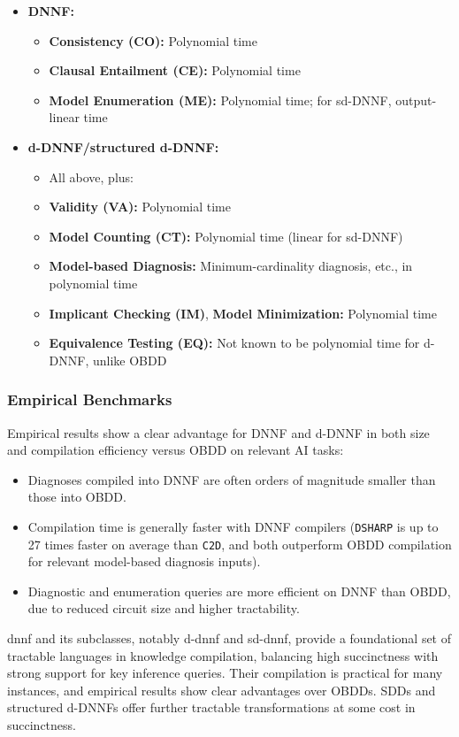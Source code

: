 \begin{itemize}
    \item \textbf{DNNF:}
    \begin{itemize}
        \item \textbf{Consistency (CO):} Polynomial time
        \item \textbf{Clausal Entailment (CE):} Polynomial time
        \item \textbf{Model Enumeration (ME):} Polynomial time; for sd-DNNF, output-linear time
    \end{itemize}
    \item \textbf{d-DNNF/structured d-DNNF:}
    \begin{itemize}
        \item All above, plus:
        \item \textbf{Validity (VA):} Polynomial time
        \item \textbf{Model Counting (CT):} Polynomial time (linear for sd-DNNF)
        \item \textbf{Model-based Diagnosis:} Minimum-cardinality diagnosis, etc., in polynomial time
        \item \textbf{Implicant Checking (IM)}, \textbf{Model Minimization:} Polynomial time
        \item \textbf{Equivalence Testing (EQ):} Not known to be polynomial time for d-DNNF, unlike OBDD
    \end{itemize}
\end{itemize}

\subsubsection{Empirical Benchmarks}
Empirical results show a clear advantage for DNNF and d-DNNF in both size and compilation efficiency versus OBDD on relevant AI tasks:
\begin{itemize}
    \item Diagnoses compiled into DNNF are often orders of magnitude smaller than those into OBDD.
    \item Compilation time is generally faster with DNNF compilers (\texttt{DSHARP} is up to 27 times faster on average than \texttt{C2D}, and both outperform OBDD compilation for relevant model-based diagnosis inputs).
    \item Diagnostic and enumeration queries are more efficient on DNNF than OBDD, due to reduced circuit size and higher tractability.
\end{itemize}

\acrshort{dnnf} and its subclasses, notably \acrshort{d-dnnf} and \acrshort{sd-dnnf}, provide a foundational set of tractable languages in knowledge compilation, balancing high succinctness with strong support for key inference queries. Their compilation is practical for many instances, and empirical results show clear advantages over OBDDs. SDDs and structured d-DNNFs offer further tractable transformations at some cost in succinctness.